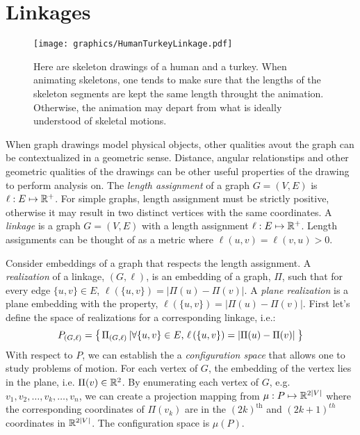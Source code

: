 \section{Linkages}
\begin{figure}[!htbp]
 \begin{center}
  \texttt{[image: graphics/HumanTurkeyLinkage.pdf]}
  \caption{Here are skeleton drawings of a human and a turkey.  When animating skeletons, one tends to make sure that the lengths of the skeleton segments are kept the same length throught the animation.  Otherwise, the animation may depart from what is ideally understood of skeletal motions.}
 \end{center}
\end{figure}

When graph drawings model physical objects, other qualities avout the graph can be contextualized in a geometric sense.  
Distance, angular relationstips and other geometric qualities of the drawings can be other useful properties of the drawing to perform analysis on.
The \textit{length assignment} of a graph $G=(V,E)$ is $\ell:E \mapsto {\mathbb{R}}^+$. 
For simple graphs, length assignment must be strictly positive, otherwise it may result in two distinct vertices with the same coordinates.
A \textit{linkage} is a graph $G = (V,E)$ with a length assignment $\ell:E \mapsto {\mathbb{R}}^+$.  
Length assignments can be thought of as a metric where $\ell(u,v) = \ell(v,u)>0$.

Consider embeddings of a graph that respects the length assignment.  
A \textit{realization} of a linkage, $(G,\ell)$, is an embedding of a graph, $\Pi$, such that for every edge $\{u,v\} \in E$, $\ell\left( \{u,v\} \right) = \left\vert \Pi(u) - \Pi(v) \right\vert$.  
A \textit{plane realization} is a plane embedding with the property, $\ell\left( \{u,v\} \right) = \left\vert \Pi(u) - \Pi(v) \right\vert$.
First let's define the space of realizations for a corresponding linkage, i.e.:
$$P_{(G,\ell)} = {\left\lbrace \left. \Pi_{(G,\ell)} \left\vert \forall \{u,v\} \in E\text{, }\ell\left( \{u,v\} \right) = \left\vert \Pi(u) - \Pi(v) \right\vert \right.\right.\right\rbrace }$$
With respect to $P$, we can establish the a \textit{configuration space} that allows one to study problems of motion.  For each vertex of $G$, the embedding of the vertex lies in the plane, i.e. $\Pi(v) \in {\mathbb{R}}^2$.  By enumerating each vertex of $G$, e.g. $v_1, v_2, \dots, v_k, \dots, v_{n}$, we can create a projection mapping from $\mu: P \mapsto {\mathbb{R}}^{2\vert V \vert}$ where the corresponding coordinates of $\Pi(v_k)$ are in the $(2k)^\text{th}$ and $(2k+1)^{th}$ coordinates in ${\mathbb{R}}^{2\vert V \vert}$.  The configuration space is $\mu(P)$.  

